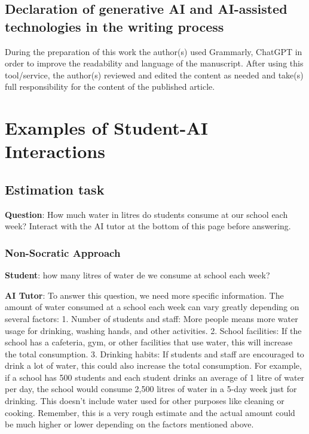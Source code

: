 \documentclass[
  11pt,
]{article}
\begin{document}
\subsection{Declaration of generative AI and AI-assisted technologies in the writing process}\label{declaration-of-generative-ai-and-ai-assisted-technologies-in-the-writing-process}

During the preparation of this work the author(s) used Grammarly, ChatGPT in order to improve the readability and language of the manuscript. After using this tool/service, the author(s) reviewed and edited the content as needed and take(s) full responsibility for the content of the published article.

\section{Examples of Student-AI Interactions}\label{examples-of-student-ai-interactions}

\subsection{Estimation task}\label{estimation-task}

\textbf{Question}: How much water in litres do students consume at our school each week? Interact with the AI tutor at the bottom of this page before answering.

\subsubsection{Non-Socratic Approach}\label{non-socratic-approach}

\textbf{Student}: how many litres of water de we consume at school each week?

\textbf{AI Tutor}: To answer this question, we need more specific information. The amount of water consumed at a school each week can vary greatly depending on several factors: 1. Number of students and staff: More people means more water usage for drinking, washing hands, and other activities. 2. School facilities: If the school has a cafeteria, gym, or other facilities that use water, this will increase the total consumption. 3. Drinking habits: If students and staff are encouraged to drink a lot of water, this could also increase the total consumption. For example, if a school has 500 students and each student drinks an average of 1 litre of water per day, the school would consume 2,500 litres of water in a 5-day week just for drinking. This doesn't include water used for other purposes like cleaning or cooking. Remember, this is a very rough estimate and the actual amount could be much higher or lower depending on the factors mentioned above.
\end{document}
